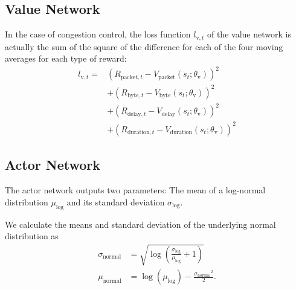 \documentclass[sigconf]{acmart}
\begin{document}

\subsection{Value Network}
\label{subsec:value}

In the case of congestion control, the loss function $l_{\text{v},t}$ of the value network is actually the sum of the square of the difference for each of the four moving averages for each type of reward:
\begin{align*}
l_{\text{v},t} =& \left(R_{\text{packet},t} - V_\text{packet}(s_t; \theta_\text{v})\right)^2 \\
&+\left(R_{\text{byte},t} - V_\text{byte}(s_t; \theta_\text{v})\right)^2 \\
&+\left(R_{\text{delay},t} - V_\text{delay}(s_t; \theta_\text{v})\right)^2 \\
&+\left(R_{\text{duration},t} - V_\text{duration}(s_t; \theta_\text{v})\right)^2
\end{align*}

\subsection{Actor Network}
\label{subsec:actor}

The actor network outputs two parameters: The mean of a log-normal distribution $\mu_\text{log}$ and its standard deviation $\sigma_\text{log}$. 

We calculate the means and standard deviation of the underlying normal distribution as
\begin{align*}
\sigma_\text{normal} &= \sqrt{\log \left( \frac{\sigma_\text{log}}{\mu_\text{log}} +1 \right)} \\
\mu_\text{normal} &= \log\left(\mu_\text{log}\right) - \frac{{\sigma_\text{normal}}^2}{2}.
\end{align*}
\end{document}
